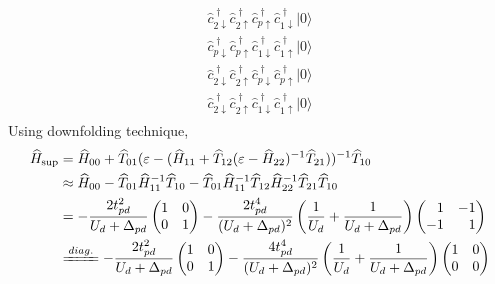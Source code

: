 \documentclass{beamer}
\begin{document}
\begin{frame}
\begin{equation}
\begin{matrix}
\begin{array}{c}
        \widehat{c}_{2\downarrow}^{\;\dagger}\widehat{c}_{2\uparrow}^{\;\dagger}\widehat{c}_{p\uparrow}^{\;\dagger}\widehat{c}_{1\downarrow}^{\;\dagger}|0\rangle\\
        \widehat{c}_{p\downarrow}^{\;\dagger}\widehat{c}_{p\uparrow}^{\;\dagger}\widehat{c}_{1\downarrow}^{\;\dagger}\widehat{c}_{1\uparrow}^{\;\dagger}|0\rangle\\
        \widehat{c}_{2\downarrow}^{\;\dagger}\widehat{c}_{2\uparrow}^{\;\dagger}\widehat{c}_{p\downarrow}^{\;\dagger}\widehat{c}_{p\uparrow}^{\;\dagger}|0\rangle\\
        \widehat{c}_{2\downarrow}^{\;\dagger}\widehat{c}_{2\uparrow}^{\;\dagger}\widehat{c}_{1\downarrow}^{\;\dagger}\widehat{c}_{1\uparrow}^{\;\dagger}|0\rangle
      \end{array}\end{matrix}
    \end{equation}
    Using downfolding technique,
    \begin{equation}
      \begin{aligned}
        \widehat{H}_{\text{sup}} &= \widehat{H}_{00} + \widehat{T}_{01}(\varepsilon - (\widehat{H}_{11}+\widehat{T}_{12}(\varepsilon-\widehat{H}_{22})^{-1}\widehat{T}_{21}))^{-1}\widehat{T}_{10}\\
        &\approx \widehat{H}_{00} - \widehat{T}_{01}\widehat{H}_{11}^{-1}\widehat{T}_{10} - \widehat{T}_{01}\widehat{H}_{11}^{-1}\widehat{T}_{12}\widehat{H}_{22}^{-1}\widehat{T}_{21}\widehat{T}_{10}\\
        &= -\dfrac{2t_{pd}^2}{U_d + \Delta_{pd}}\begin{pmatrix}
          1 & 0\\
          0 & 1
        \end{pmatrix} - \dfrac{2t^4_{pd}}{(U_d+\Delta_{pd})^2}\left(\dfrac{1}{U_d} + \dfrac{1}{U_d+\Delta_{pd}}\right)\begin{pmatrix}
          \phantom{+}1 & -1\\
          -1 & \phantom{+}1
        \end{pmatrix}\\
        &\xlongequal{diag.}-\dfrac{2t_{pd}^2}{U_d + \Delta_{pd}}\begin{pmatrix}
          1 & 0\\
          0 & 1
        \end{pmatrix} - \dfrac{4t^4_{pd}}{(U_d+\Delta_{pd})^2}\left(\dfrac{1}{U_d} + \dfrac{1}{U_d+\Delta_{pd}}\right)\begin{pmatrix}
          1 & 0\\
          0 & 0
        \end{pmatrix}
      \end{aligned}
    \end{equation}
  \end{frame}
\end{document}
